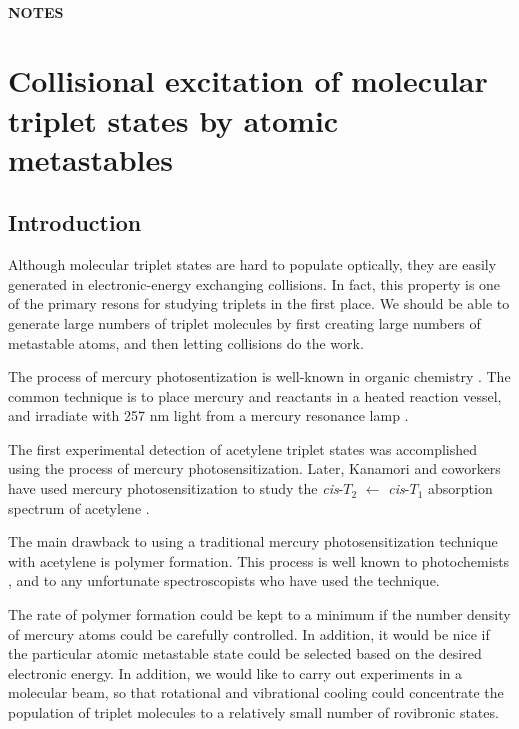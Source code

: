 \documentclass[12pt]{mitthesis}
\begin{document}
\tableofcontents
\clearpage

\subsubsection*{NOTES}
\clearpage

\chapter{Collisional excitation of molecular triplet states by atomic
  metastables}

\section{Introduction}


Although molecular triplet states are hard to populate optically, they
are easily generated in electronic-energy exchanging collisions.  In
fact, this property is one of the primary resons for studying triplets
in the first place.  We should be able to generate large numbers of
triplet molecules by first creating large numbers of metastable atoms,
and then letting collisions do the work.

The process of mercury photosentization is well-known in organic
chemistry \cite{brown89, brown88, crabtree92, cvetanovic64,
  phillips74, strausz70}.  The common technique is to place mercury
and reactants in a heated reaction vessel, and irradiate with 257 nm
light from a mercury resonance lamp \cite{brown87}.

The first experimental detection of acetylene triplet states was
accomplished using the process of mercury photosensitization.  Later,
Kanamori and coworkers have used mercury photosensitization to study
the \emph{cis}-$T_2$ $\leftarrow$ \emph{cis}-$T_1$ absorption spectrum
of acetylene \cite{kanamori07}.

The main drawback to using a traditional mercury photosensitization
technique with acetylene is polymer formation.  This process is well
known to photochemists \cite{shida58, leroy44}, and to any unfortunate
spectroscopists who have used the technique.

The rate of polymer formation could be kept to a minimum if the number
density of mercury atoms could be carefully controlled.  In addition,
it would be nice if the particular atomic metastable state could be
selected based on the desired electronic energy.  In addition, we
would like to carry out experiments in a molecular beam, so that
rotational and vibrational cooling could concentrate the population of
triplet molecules to a relatively small number of rovibronic states.
\end{document}
